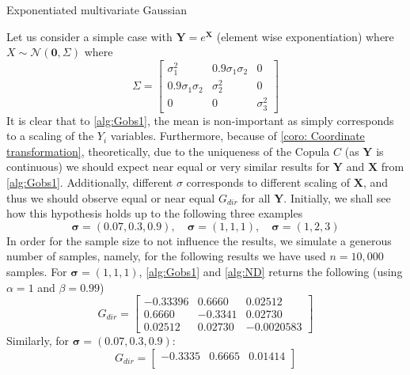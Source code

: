 \documentclass[../Thesis.tex]{subfiles}
\begin{document}
\begin{example} \label{ex:1}
    Exponentiated multivariate Gaussian

    Let us consider a simple case with $\mathbf{Y} = e^{\mathbf{X}}$ (element wise exponentiation) where $X \sim \mathcal{N}\left(\mathbf{0}, \Sigma\right)$ where
    $$\Sigma = \begin{bmatrix}
            \sigma_1^2           & 0.9\sigma_1\sigma_2 & 0          \\
            0.9 \sigma_1\sigma_2 & \sigma_2^2          & 0          \\
            0                    & 0                   & \sigma_3^2
        \end{bmatrix}$$
    It is clear that to \autoref{alg:Gobs1}, the mean is non-important as simply corresponds to a scaling of the $Y_i$ variables. Furthermore, because of \autoref{coro: Coordinate transformation}, theoretically, due to the uniqueness of the Copula $C$ (as $\boldsymbol Y$ is continuous) we should expect near equal or very similar results for $\boldsymbol Y$ and $\boldsymbol X$ from \autoref{alg:Gobs1}. Additionally, different $\sigma$ corresponds to different scaling of $\boldsymbol X$, and thus we should observe equal or near equal $G_{dir}$ for all $\boldsymbol Y$. Initially, we shall see how this hypothesis holds up to the following three examples
    $$
        \boldsymbol\sigma = (0.07, 0.3, 0.9), \quad
        \boldsymbol\sigma = (1,1,1), \quad
        \boldsymbol\sigma = (1,2,3)
    $$
    In order for the sample size to not influence the results, we simulate a generous number of samples, namely, for the following results we have used $n = 10{,}000$ samples. For $\boldsymbol\sigma = (1,1,1)$, \autoref{alg:Gobs1} and \autoref{alg:ND} returns the following (using $\alpha = 1$ and $\beta = 0.99$)
    \begin{equation} \label{eq:s medium G_dir}
        G_{dir} =
        \begin{bmatrix}
            -0.33396 & 0.6660  & 0.02512    \\
            0.6660   & -0.3341 & 0.02730    \\
            0.02512  & 0.02730 & -0.0020583
        \end{bmatrix}
    \end{equation}
    Similarly, for $\boldsymbol\sigma = (0.07, 0.3, 0.9)$:
    \begin{equation} \label{eq:s small G_dir}
        G_{dir} =
        \begin{bmatrix}
            -0.3335 & 0.6665  & 0.01414     \\

\end{bmatrix}
\end{equation}
\end{example}
\end{document}
